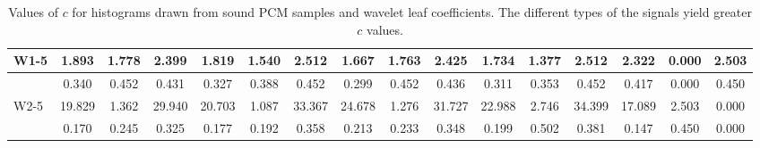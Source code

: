 \begin{table*}[h!]
\begin{center}
\begin{tabular}{| l | c | c | c | c | c | c | c | c | c | c | c | c | c | c | c |}
W1-5 & 1.893  & 1.778  & 2.399  & 1.819  & 1.540  & 2.512  & 1.667  & 1.763  & 2.425  & 1.734  & 1.377  & 2.512  & 2.322  & 0.000  & 2.503 \\\hline
 & 0.340  & 0.452  & 0.431  & 0.327  & 0.388  & 0.452  & 0.299  & 0.452  & 0.436  & 0.311  & 0.353  & 0.452  & 0.417  & 0.000  & 0.450 \\\hline
W2-5 & 19.829  & 1.362  & 29.940  & 20.703  & 1.087  & 33.367  & 24.678  & 1.276  & 31.727  & 22.988  & 2.746  & 34.399  & 17.089  & 2.503  & 0.000 \\\hline
 & 0.170  & 0.245  & 0.325  & 0.177  & 0.192  & 0.358  & 0.213  & 0.233  & 0.348  & 0.199  & 0.502  & 0.381  & 0.147  & 0.450  & 0.000 \\\hline
\end{tabular}
\caption{Values of $c$ for histograms drawn from sound PCM samples and wavelet leaf coefficients.
The different types of the signals yield greater $c$ values.}
\end{center}
\end{table*}